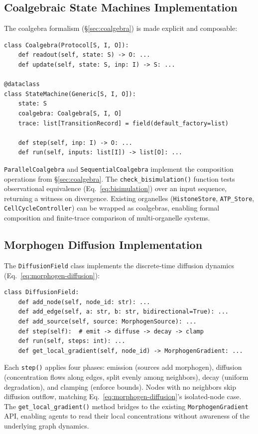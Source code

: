 \subsection{Coalgebraic State Machines Implementation}

The coalgebra formalism (\S\ref{sec:coalgebra}) is made explicit and composable:

\begin{verbatim}
class Coalgebra(Protocol[S, I, O]):
    def readout(self, state: S) -> O: ...
    def update(self, state: S, inp: I) -> S: ...

@dataclass
class StateMachine(Generic[S, I, O]):
    state: S
    coalgebra: Coalgebra[S, I, O]
    trace: list[TransitionRecord] = field(default_factory=list)

    def step(self, inp: I) -> O: ...
    def run(self, inputs: list[I]) -> list[O]: ...
\end{verbatim}

\texttt{ParallelCoalgebra} and \texttt{SequentialCoalgebra} implement the composition operations from \S\ref{sec:coalgebra}. The \texttt{check\_bisimulation()} function tests observational equivalence (Eq.~\eqref{eq:bisimulation}) over an input sequence, returning a witness on divergence. Existing organelles (\texttt{HistoneStore}, \texttt{ATP\_Store}, \texttt{CellCycleController}) can be wrapped as coalgebras, enabling formal composition and finite-trace comparison of multi-organelle systems.

\subsection{Morphogen Diffusion Implementation}

The \texttt{DiffusionField} class implements the discrete-time diffusion dynamics (Eq.~\eqref{eq:morphogen-diffusion}):

\begin{verbatim}
class DiffusionField:
    def add_node(self, node_id: str): ...
    def add_edge(self, a: str, b: str, bidirectional=True): ...
    def add_source(self, source: MorphogenSource): ...
    def step(self):  # emit -> diffuse -> decay -> clamp
    def run(self, steps: int): ...
    def get_local_gradient(self, node_id) -> MorphogenGradient: ...
\end{verbatim}

Each \texttt{step()} applies four phases: emission (sources add morphogen), diffusion (concentration flows along edges, split evenly among neighbors), decay (uniform degradation), and clamping (enforce bounds). Nodes with no neighbors skip diffusion outflow, matching Eq.~\eqref{eq:morphogen-diffusion}'s isolated-node case. The \texttt{get\_local\_gradient()} method bridges to the existing \texttt{MorphogenGradient} API, enabling agents to read their local concentrations without awareness of the underlying graph dynamics.

